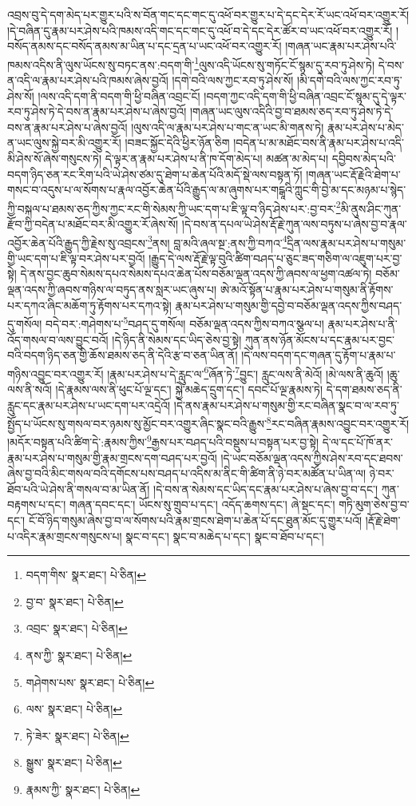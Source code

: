 འབྲས་བུ་དེ་དག་མེད་པར་གྱུར་པའི་ས་བོན་གང་དང་གང་དུ་འཕོ་བར་གྱུར་པ་དེ་དང་དེར་རོ་ཡང་འཕོ་བར་འགྱུར་རོ། །དེ་བཞིན་དུ་རྣམ་པར་ཤེས་པའི་ཁམས་འདི་གང་དང་གང་དུ་འཕོ་བ་དེ་དང་དེར་ཚོར་བ་ཡང་འཕོ་བར་འགྱུར་རོ། །བསོད་ནམས་དང་བསོད་ནམས་མ་ཡིན་པ་དང་དྲན་པ་ཡང་འཕོ་བར་འགྱུར་རོ། །གཞན་ཡང་རྣམ་པར་ཤེས་པའི་ཁམས་འདིས་ནི་ལུས་ཡོངས་སུ་བཏང་ནས་:བདག་གི་\footnote{བདག་གིས་  སྣར་ཐང་།  པེ་ཅིན། }ལུས་འདི་ཡོངས་སུ་གཏོང་ངོ་སྙམ་དུ་རབ་ཏུ་ཤེས་ཏེ། དེ་བས་ན་འདི་ལ་རྣམ་པར་ཤེས་པའི་ཁམས་ཞེས་བྱའོ། །དགེ་བའི་ལས་ཀྱང་རབ་ཏུ་ཤེས་སོ། །མི་དགེ་བའི་ལས་ཀྱང་རབ་ཏུ་ཤེས་སོ། །ལས་འདི་དག་ནི་བདག་གི་ཕྱི་བཞིན་འབྲང་ངོ། །བདག་ཀྱང་འདི་དག་གི་ཕྱི་བཞིན་འབྲང་ངོ་སྙམ་དུ་དེ་ལྟར་རབ་ཏུ་ཤེས་ཏེ་དེ་བས་ན་རྣམ་པར་ཤེས་པ་ཞེས་བྱའོ། །གཞན་ཡང་ལུས་འདིའི་བྱ་བ་ཐམས་ཅད་རབ་ཏུ་ཤེས་ཏེ་དེ་བས་ན་རྣམ་པར་ཤེས་པ་ཞེས་བྱའོ། །ལུས་འདི་ལ་རྣམ་པར་ཤེས་པ་གང་ན་ཡང་མི་གནས་ཏེ། རྣམ་པར་ཤེས་པ་མེད་ན་ཡང་ལུས་སྐྱེ་བར་མི་འགྱུར་རོ། །བཟང་སྐྱོང་དེའི་ཕྱིར་ཉོན་ཅིག །བདེན་པ་མ་མཐོང་བས་ནི་རྣམ་པར་ཤེས་པ་འདི་མི་ཤེས་སོ་ཞེས་གསུངས་ཏེ། དེ་ལྟར་ན་རྣམ་པར་ཤེས་པ་ནི་ཁ་དོག་མེད་པ། མཚན་མ་མེད་པ། དབྱིབས་མེད་པའི་བདག་ཉིད་ཅན་རང་རིག་པའི་ཡེ་ཤེས་ཙམ་དུ་ཐེག་པ་ཆེན་པོའི་མདོ་སྡེ་ལས་བསྟན་ཏོ། །གཞན་ཡང་རྡོ་རྗེའི་ཐེག་པ་གསང་བ་འདུས་པ་ལ་སོགས་པ་རྣལ་འབྱོར་ཆེན་པོའི་རྒྱུད་ལ་མ་ཞུགས་པར་གངྒཱའི་ཀླུང་གི་བྱེ་མ་དང་མཉམ་པ་སྙེད་ཀྱི་བསྐལ་པ་ཐམས་ཅད་ཀྱིས་ཀྱང་རང་གི་སེམས་ཀྱི་ཡང་དག་པ་ཇི་ལྟ་བ་ཉིད་ཤེས་པར་:བྱ་བར་\footnote{བྱ་བ་  སྣར་ཐང་།  པེ་ཅིན། }མི་ནུས་ཤིང་ཀུན་རྫོབ་ཀྱི་བདེན་པ་མཐོང་བར་མི་འགྱུར་རོ་ཞེས་སོ། །དེ་བས་ན་དཔལ་ཡེ་ཤེས་རྡོ་རྗེ་ཀུན་ལས་བཏུས་པ་ཞེས་བྱ་བ་རྣལ་འབྱོར་ཆེན་པོའི་རྒྱུད་ཀྱི་རྗེས་སུ་འབྲངས་\footnote{འབྲང་  སྣར་ཐང་།  པེ་ཅིན། }ནས། བླ་མའི་ཞལ་སྔ་:ནས་ཀྱི་བཀའ་\footnote{ནས་ཀྱི་  སྣར་ཐང་།  པེ་ཅིན། }དྲིན་ལས་རྣམ་པར་ཤེས་པ་གསུམ་གྱི་ཡང་དག་པ་ཇི་ལྟ་བར་ཤེས་པར་བྱའོ། །རྒྱུད་དེ་ལས་རྡོ་རྗེ་ལྟ་བུའི་ཚིག་བཤད་པ་ཅུང་ཟད་གཅིག་ལ་འཇུག་པར་བྱ་སྟེ། དེ་ནས་བྱང་ཆུབ་སེམས་དཔའ་སེམས་དཔའ་ཆེན་པོས་བཅོམ་ལྡན་འདས་ཀྱི་ཞབས་ལ་ཕྱག་འཚལ་ཏེ། བཅོམ་ལྡན་འདས་ཀྱི་ཞབས་གཉིས་ལ་བཏུད་ནས་སླར་ཡང་ཞུས་པ། ཨེ་མའོ་སྟོན་པ་རྣམ་པར་ཤེས་པ་གསུམ་ནི་རྟོགས་པར་དཀའ་ཞིང་མཆོག་ཏུ་རྟོགས་པར་དཀའ་སྟེ། རྣམ་པར་ཤེས་པ་གསུམ་གྱི་དབྱེ་བ་བཅོམ་ལྡན་འདས་ཀྱིས་བཤད་དུ་གསོལ། བདེ་བར་:གཤེགས་པ་\footnote{གཤེགས་པས་  སྣར་ཐང་།  པེ་ཅིན། }བཤད་དུ་གསོལ། བཅོམ་ལྡན་འདས་ཀྱིས་བཀའ་སྩལ་པ། རྣམ་པར་ཤེས་པ་ནི་འོད་གསལ་བ་ལས་བྱུང་བའོ། །དེ་ཉིད་ནི་སེམས་དང་ཡིད་ཅེས་བྱ་སྟེ། ཀུན་ནས་ཉོན་མོངས་པ་དང་རྣམ་པར་བྱང་བའི་བདག་ཉིད་ཅན་གྱི་ཆོས་ཐམས་ཅད་ནི་དེའི་རྩ་བ་ཅན་ཡིན་ནོ། །དེ་ལས་བདག་དང་གཞན་དུ་རྟོག་པ་རྣམ་པ་གཉིས་འབྱུང་བར་འགྱུར་རོ། །རྣམ་པར་ཤེས་པ་དེ་རླུང་ལ་\footnote{ལས་  སྣར་ཐང་།  པེ་ཅིན། }ཞོན་ཏེ་\footnote{ཏེ་ཟེར་  སྣར་ཐང་།  པེ་ཅིན། }བྱུང་། རླུང་ལས་ནི་མེའོ། །མེ་ལས་ནི་ཆུའོ། །ཆུ་ལས་ནི་སའོ། །དེ་རྣམས་ལས་ནི་ཕུང་པོ་ལྔ་དང་། སྐྱེ་མཆེད་དྲུག་དང་། དབང་པོ་ལྔ་རྣམས་ཏེ། དེ་དག་ཐམས་ཅད་ནི་རླུང་དང་རྣམ་པར་ཤེས་པ་ཡང་དག་པར་འདྲེའོ། །དེ་ནས་རྣམ་པར་ཤེས་པ་གསུམ་གྱི་རང་བཞིན་སྣང་བ་ལ་རབ་ཏུ་སྤྱོད་པ་ཡོངས་སུ་གསལ་བར་ཉམས་སུ་མྱོང་བར་འགྱུར་ཞིང་སྣང་བའི་རྒྱུས་\footnote{སྒྱུས་  སྣར་ཐང་།  པེ་ཅིན། }རང་བཞིན་རྣམས་འབྱུང་བར་འགྱུར་རོ། །མདོར་བསྟན་པའི་ཚིག་དེ་:རྣམས་ཀྱིས་\footnote{རྣམས་ཀྱི་  སྣར་ཐང་།  པེ་ཅིན། }རྒྱས་པར་བཤད་པའི་བསྡུས་པ་བསྟན་པར་བྱ་སྟེ། དེ་ལ་དང་པོ་ཁོ་ནར་རྣམ་པར་ཤེས་པ་གསུམ་གྱི་རྣམ་གྲངས་དག་བཤད་པར་བྱའོ། །དེ་ཡང་བཅོམ་ལྡན་འདས་ཀྱིས་ཤེས་རབ་དང་ཐབས་ཞེས་བྱ་བའི་མིང་གསལ་བའི་དགོངས་པས་བཤད་པ་འདིས་མ་ནིང་གི་ཚིག་ནི་ཉེ་བར་མཚོན་པ་ཡིན་ལ། ཉེ་བར་ཐོབ་པའི་ཡེ་ཤེས་ནི་གསལ་བ་མ་ཡིན་ནོ། །དེ་བས་ན་སེམས་དང་ཡིད་དང་རྣམ་པར་ཤེས་པ་ཞེས་བྱ་བ་དང་། ཀུན་བརྟགས་པ་དང་། གཞན་དབང་དང་། ཡོངས་སུ་གྲུབ་པ་དང་། འདོད་ཆགས་དང་། ཞེ་སྡང་དང་། གཏི་མུག་ཅེས་བྱ་བ་དང་། ངོ་བོ་ཉིད་གསུམ་ཞེས་བྱ་བ་ལ་སོགས་པའི་རྣམ་གྲངས་ཐེག་པ་ཆེན་པོ་དང་ཐུན་མོང་དུ་གྱུར་པའོ། །རྡོ་རྗེ་ཐེག་པ་འདིར་རྣམ་གྲངས་གསུངས་པ། སྣང་བ་དང་། སྣང་བ་མཆེད་པ་དང་། སྣང་བ་ཐོབ་པ་དང་། 